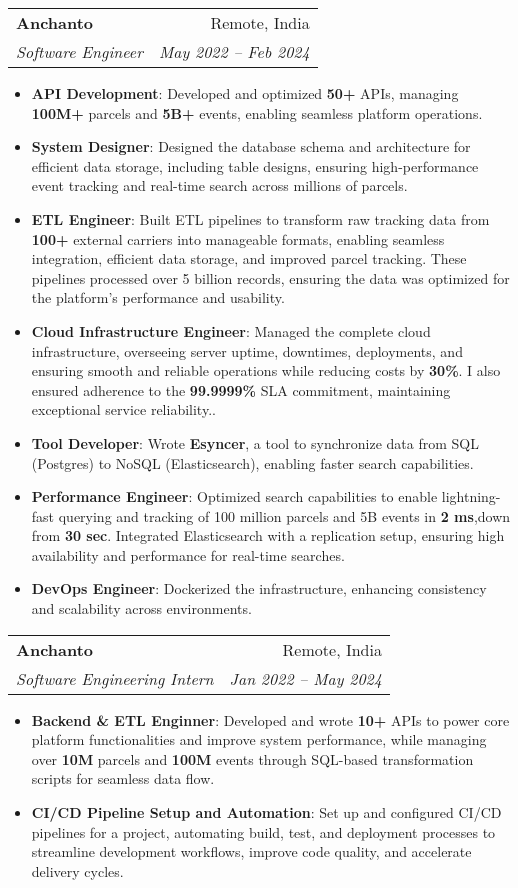 \documentclass[letterpaper,11pt]{article}
\makeatletter
\newcommand{\resumeItem}[2]{
  \item\small{
    \textbf{#1}{: #2 \vspace{-2pt}}
  }
}
\newcommand{\resumeSubheading}[4]{
  \vspace{-1pt}\item
    \begin{tabular*}{0.97\textwidth}[t]{l@{\extracolsep{\fill}}r}
      \textbf{#1} & #2 \\
      \textit{\small#3} & \textit{\small #4} \\
    \end{tabular*}\vspace{-5pt}
}
\newcommand{\resumeItemListStart}{\begin{itemize}}
\newcommand{\resumeItemListEnd}{\end{itemize}\vspace{-5pt}}
\makeatother
\begin{document}
    \resumeSubheading
      {Anchanto}{Remote, India}
      {Software Engineer}{May 2022 -- Feb 2024}
      \resumeItemListStart
        \resumeItem{API Development}
          {Developed and optimized \textbf{50+} APIs, managing \textbf{100M+} parcels and \textbf{5B+} events, enabling seamless platform operations.}
        \resumeItem{System Designer}
          {Designed the database schema and architecture for efficient data storage, including table designs, ensuring high-performance event tracking and real-time search across millions of parcels.}
        \resumeItem{ETL Engineer}
          {Built ETL pipelines to transform raw tracking data from \textbf{100+} external carriers into manageable formats, enabling seamless integration, efficient data storage, and improved parcel tracking. These pipelines processed over 5 billion records, ensuring the data was optimized for the platform's performance and usability.}
        \resumeItem{Cloud Infrastructure Engineer}
          {Managed the complete cloud infrastructure, overseeing server uptime, downtimes, deployments, and ensuring smooth and reliable operations while reducing costs by \textbf{30\%}. I also ensured adherence to the \textbf{99.9999\%} SLA commitment, maintaining exceptional service reliability..}
        \resumeItem{Tool Developer}
          {Wrote \textbf{Esyncer}, a tool to synchronize data from SQL (Postgres) to NoSQL (Elasticsearch), enabling faster search capabilities.}
        \resumeItem{Performance Engineer}
          {Optimized search capabilities to enable lightning-fast querying and tracking of 100 million parcels and 5B events in \textbf{2 ms},down from \textbf{30 sec}. Integrated Elasticsearch with a replication setup, ensuring high availability and performance for real-time searches.}
        \resumeItem{DevOps Engineer}
          {Dockerized the infrastructure, enhancing consistency and scalability across environments.}
      \resumeItemListEnd
    \resumeSubheading
      {Anchanto}{Remote, India}
      {Software Engineering Intern}{Jan 2022 -- May 2024}
      \resumeItemListStart
        \resumeItem{Backend \& ETL Enginner}
          {Developed and wrote \textbf{10+} APIs to power core platform functionalities and improve system performance, while managing over \textbf{10M} parcels and \textbf{100M} events through SQL-based transformation scripts for seamless data flow.}
        \resumeItem{CI/CD Pipeline Setup and Automation}
          {Set up and configured CI/CD pipelines for a project, automating build, test, and deployment processes to streamline development workflows, improve code quality, and accelerate delivery cycles.}
       \resumeItemListEnd
\end{document}
